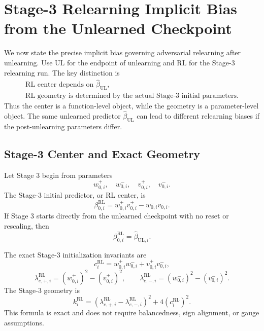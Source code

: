 \documentclass[11pt]{article}
\begin{document}
\section{Stage-3 Relearning Implicit Bias from the Unlearned Checkpoint}
\label{sec:stage3-relearning-bias}

We now state the precise implicit bias governing adversarial relearning after unlearning. Use \(\mathrm{UL}\) for the endpoint of unlearning and \(\mathrm{RL}\) for the Stage-3 relearning run. The key distinction is
\begin{equation}
    \boxed{
    \begin{gathered}
    \text{RL center depends on }\widehat\beta_{\mathrm{UL}},\\
    \text{RL geometry is determined by the actual Stage-3 initial parameters.}
    \end{gathered}
    }
\end{equation}
Thus the center is a function-level object, while the geometry is a parameter-level object. The same unlearned predictor \(\widehat\beta_{\mathrm{UL}}\) can lead to different relearning biases if the post-unlearning parameters differ.

\subsection{Stage-3 Center and Exact Geometry}

Let Stage 3 begin from parameters
\begin{equation}
    w_{0,i}^{+},
    \quad
    w_{0,i}^{-},
    \quad
    v_{0,i}^{+},
    \quad
    v_{0,i}^{-}.
\end{equation}
The Stage-3 initial predictor, or RL center, is
\begin{equation}
    \beta_{0,i}^{\mathrm{RL}}
    =
    w_{0,i}^{+}v_{0,i}^{+}
    -
    w_{0,i}^{-}v_{0,i}^{-}.
\end{equation}
If Stage 3 starts directly from the unlearned checkpoint with no reset or rescaling, then
\begin{equation}
    \boxed{
    \beta_{0,i}^{\mathrm{RL}}
    =
    \widehat\beta_{\mathrm{UL},i}.
    }
\end{equation}

The exact Stage-3 initialization invariants are
\begin{equation}
    c_i^{\mathrm{RL}}
    =
    w_{0,i}^{+}w_{0,i}^{-}
    +
    v_{0,i}^{+}v_{0,i}^{-},
\end{equation}
\begin{equation}
    \lambda_{e,+,i}^{\mathrm{RL}}
    =
    (w_{0,i}^{+})^2
    -
    (v_{0,i}^{+})^2,
    \qquad
    \lambda_{e,-,i}^{\mathrm{RL}}
    =
    (w_{0,i}^{-})^2
    -
    (v_{0,i}^{-})^2.
\end{equation}
The Stage-3 geometry is
\begin{equation}
    \boxed{
    k_i^{\mathrm{RL}}
    =
    \left(
        \lambda_{e,+,i}^{\mathrm{RL}}
        -
        \lambda_{e,-,i}^{\mathrm{RL}}
    \right)^2
    +
    4\left(c_i^{\mathrm{RL}}\right)^2.
    }
\end{equation}
This formula is exact and does not require balancedness, sign alignment, or gauge assumptions.
\end{document}
